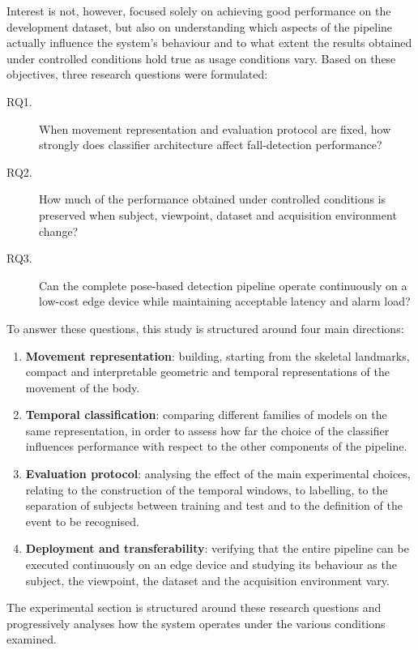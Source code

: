 Interest is not, however, focused solely on achieving good performance on the development dataset, but also on understanding which aspects of the pipeline actually influence the system's behaviour and to what extent the results obtained under controlled conditions hold true as usage conditions vary.
Based on these objectives, three research questions were formulated:
\begin{description}
    \item[RQ1.] When movement representation and evaluation protocol are fixed, how strongly does classifier architecture affect fall-detection performance?
    \item[RQ2.] How much of the performance obtained under controlled conditions is preserved when subject, viewpoint, dataset and acquisition environment change?
    \item[RQ3.] Can the complete pose-based detection pipeline operate continuously on a low-cost edge device while maintaining acceptable latency and alarm load?
\end{description}

To answer these questions, this study is structured around four main directions:
\begin{enumerate}
    \item \textbf{Movement representation}: building, starting from the
          skeletal landmarks, compact and interpretable geometric and temporal
          representations of the movement of the body.
    \item \textbf{Temporal classification}: comparing different families of
          models on the same representation, in order to assess how far the
          choice of the classifier influences performance with respect to the
          other components of the pipeline.
    \item \textbf{Evaluation protocol}: analysing the effect of the main
          experimental choices, relating to the construction of the temporal
          windows, to labelling, to the separation of subjects between training
          and test and to the definition of the event to be recognised.
    \item \textbf{Deployment and transferability}: verifying that the entire
          pipeline can be executed continuously on an edge device and studying
          its behaviour as the subject, the viewpoint, the dataset and the
          acquisition environment vary. 
\end{enumerate}

The experimental section is structured around these research questions and progressively analyses how the system operates under the various conditions examined.